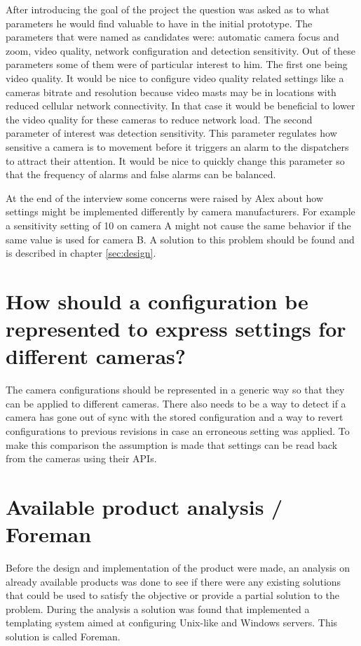 After introducing the goal of the project the question was asked as to what parameters he would find valuable to have in the initial prototype.
The parameters that were named as candidates were: automatic camera focus and zoom, video quality, network configuration and detection sensitivity.
Out of these parameters some of them were of particular interest to him. The first one being video quality. It would be nice to configure video quality related settings like a
cameras bitrate and resolution because video masts may be in locations with reduced cellular network connectivity. In that case it would be beneficial to lower the video quality
for these cameras to reduce network load. The second parameter of interest was detection sensitivity. This parameter regulates how sensitive a camera is to movement before it
triggers an alarm to the dispatchers to attract their attention. It would be nice to quickly change this parameter so that the frequency of alarms and false alarms can be balanced.


At the end of the interview some concerns were raised by Alex about how settings might be implemented differently by camera manufacturers. For example a sensitivity setting of 10
on camera A might not cause the same behavior if the same value is used for camera B. A solution to this problem should be found and is described in chapter \ref{sec:design}.

\section{How should a configuration be represented to express settings for different cameras?}
The camera configurations should be represented in a generic way so that they can be applied to different cameras. There also needs to be a way to detect if a camera
has gone out of sync with the stored configuration and a way to revert configurations to previous revisions in case an erroneous setting was applied. To make this comparison the assumption is made that settings can be read back from the cameras using their APIs.

\section{Available product analysis / Foreman}
Before the design and implementation of the product were made, an analysis on already available products was done to see if there were any existing solutions that could be used to satisfy the objective or provide a partial solution to the problem.
During the analysis a solution was found that implemented a templating system aimed at configuring Unix-like and Windows servers.
This solution is called Foreman.


